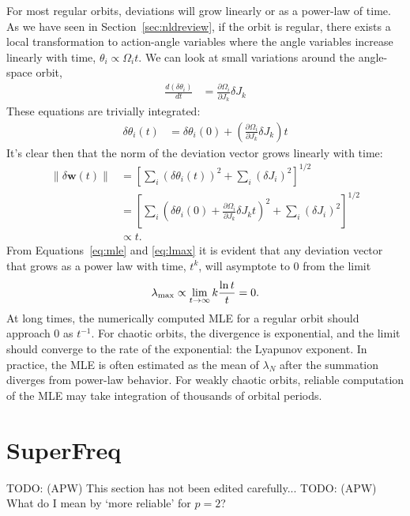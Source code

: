 \documentclass[letterpaper,12pt,preprint]{aastex}
\newcommand{\bs}[1]{\boldsymbol{#1}}
\newcommand{\todo}[2]{{\color{red} TODO: (\MakeUppercase{#1}) #2}}
\begin{document}
For most regular orbits, deviations will grow linearly or as a power-law of time. As we have seen in Section~\ref{sec:nldreview}, if the orbit is regular, there exists a local transformation to action-angle variables where the angle variables increase linearly with time, $\theta_i \propto \Omega_i t$. We can look at small variations around the angle-space orbit,
\begin{align}
	\frac{d (\delta \theta_i)}{dt} &= \frac{\partial \Omega_i}{\partial J_k} \delta J_k
\end{align}
These equations are trivially integrated:
\begin{align}
	\delta \theta_i(t) &= \delta \theta_i(0) + \left(\frac{\partial \Omega_i}{\partial J_k} \delta J_k \right) t
\end{align}
It's clear then that the norm of the deviation vector grows linearly with time:
\begin{align}
	\|\delta \bs{w}(t)\| &= \left[\sum_i (\delta \theta_i(t))^2 + \sum_i (\delta J_i)^2\right]^{1/2}\\
	&= \left[\sum_i \left(\delta \theta_i(0) + \frac{\partial \Omega_i}{\partial J_k} \delta J_k t\right)^2 + \sum_i (\delta J_i)^2\right]^{1/2}\\
	&\propto t.
\end{align}
From Equations~\ref{eq:mle} and \ref{eq:lmax} it is evident that any deviation vector that grows as a power law with time, $t^k$, will asymptote to 0 from the limit 
\begin{equation}
	\lambda_{\rm max} \propto \lim_{t\rightarrow \infty} k \frac{\ln t}{t} = 0.
\end{equation}
At long times, the numerically computed MLE for a regular orbit should approach 0 as $t^{-1}$. For chaotic orbits, the divergence is exponential, and the limit should converge to the rate of the exponential: the Lyapunov exponent. In practice, the MLE is often estimated as the mean of $\lambda_N$ after the summation diverges from power-law behavior. For weakly chaotic orbits, reliable computation of the MLE may take integration of thousands of orbital periods.

\section{SuperFreq}\label{sec:naffapdx}

\todo{apw}{This section has not been edited carefully...}
\todo{apw}{What do I mean by `more reliable' for $p=2$?}
\end{document}
